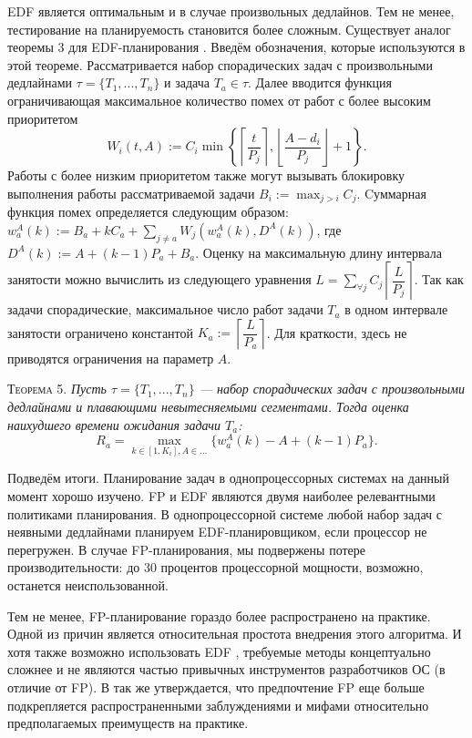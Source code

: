 \documentclass[14pt]{matmex-diploma-custom}
\begin{document}
EDF является оптимальным и в случае произвольных дедлайнов. Тем не менее, тестирование на планируемость становится более сложным. Существует аналог теоремы 3 для EDF-планирования \cite{Harbour2003ResponseTA}. Введём обозначения, которые используются в этой теореме. Рассматривается набор спорадических задач с произвольными дедлайнами $\tau = \{T_1, ... , T_n\}$ и задача $T_a \in \tau$. Далее вводится функция ограничивающая максимальное количество помех от работ с более высоким приоритетом $$W_i(t, A) := C_i \min{ \left \{ \left \lceil \dfrac{t}{P_j} \right \rceil, \left \lfloor \dfrac{A - d_i}{P_j} \right \rfloor + 1 \right \} }.$$ Работы с более низким приоритетом также могут вызывать блокировку выполнения работы рассматриваемой задачи $B_i := \max_{j>i} C_{j}$. Cуммарная функция помех определяется следующим образом: $w_a^A(k) := B_a + k C_a + \sum_{j \neq a} W_j(w^A_a(k), D^A(k))$, где $D^A(k) := A + (k - 1)P_a + B_a $. Оценку на максимальную длину интервала занятости можно вычислить из следующего уравнения $L = \sum_{\forall j} C_j \left \lceil \dfrac{L}{P_j} \right \rceil$. Так как задачи спорадические, максимальное число работ задачи $T_a$ в одном интервале занятости ограничено константой $K_a := \left \lceil \dfrac{L}{P_a} \right \rceil$. Для краткости, здесь не приводятся ограничения на параметр $A$.

\textsc{Теорема 5. }
\textit{Пусть $\tau = \{T_1, ... , T_n\}$ --- набор спорадических задач с произвольными дедлайнами и плавающими невытесняемыми сегментами. Тогда оценка 
  наихудшего времени ожидания задачи $T_a$: $$R_a = \max_{k \in [1, K_i], A \in ...} \{ w_a^A(k) - A  + (k - 1)P_a \}.$$}

Подведём итоги. Планирование задач в однопроцессорных системах на данный момент хорошо изучено. FP и EDF являются двумя наиболее релевантными политиками планирования. В однопроцессорной системе любой набор задач с неявными дедлайнами планируем EDF-планировщиком, если процессор не перегружен. В случае FP-планирования, мы подвержены потере производительности: до 30 процентов процессорной мощности, возможно, останется неиспользованной.

Тем не менее, FP-планирование гораздо более распространено на практике. Одной из причин является относительная простота внедрения этого алгоритма. И хотя также возможно использовать EDF \cite{Short2010ImprovedTM}, требуемые методы концептуально сложнее и не являются частью привычных инструментов разработчиков ОС (в отличие от FP). В \cite{Buttazzo2003RateMV} так же утверждается, что предпочтение FP еще больше подкрепляется распространенными заблуждениями и мифами относительно предполагаемых преимуществ на практике.
  
\end{document}
